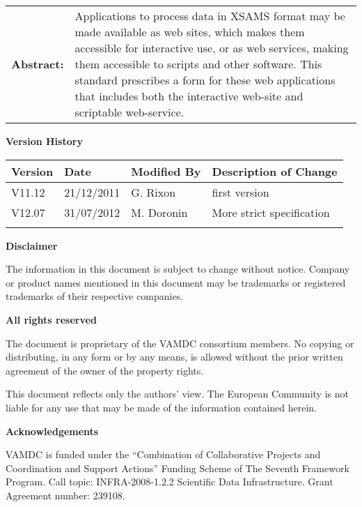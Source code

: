 {\begin{titlepage}
\begin{tabular}{p{1.7in}p{4.3in}}
\textbf{Abstract:} & 
Applications to process data in XSAMS format may be made available as web sites, 
which makes them accessible for interactive use, or as web services, 
making them accessible to scripts and other software. 
This standard prescribes a form for these web applications 
that includes both the interactive web-site and scriptable web-service.
\end{tabular}



\end{titlepage}

\noindent \textbf{Version History}

\textbf{}

\noindent \begin{tabular}{|l|l|l|l|} 
\hline 
\textbf{Version} & \textbf{Date} & \textbf{Modified By} & \textbf{Description of Change} \\ \hline 
V11.12   & 21/12/2011 & G. Rixon & first version \\ \hline 
V12.07	 & 31/07/2012 & M. Doronin & More strict specification \\ \hline 
 &  &  &  \\ \hline 
\end{tabular}

\textbf{}

\noindent \textbf{Disclaimer}

\noindent The information in this document is subject to change without notice. Company or product names mentioned in this document may be trademarks or registered trademarks of their respective companies.


\textbf{}

\noindent \textbf{All rights reserved}

\noindent The document is proprietary of the VAMDC consortium members. No copying or distributing, in any form or by any means, is allowed without the prior written agreement of the owner of the property rights.

\noindent 

\noindent This document reflects only the authors' view. The European Community is not liable for any use that may be made of the information contained herein.

\textbf{}

\noindent \textbf{Acknowledgements}

\noindent VAMDC is funded under the ``Combination of Collaborative Projects and Coordination and  Support Actions'' Funding Scheme of The Seventh Framework Program. Call topic: INFRA-2008-1.2.2 Scientific Data Infrastructure. Grant Agreement number: 239108.

\textbf{}

}
